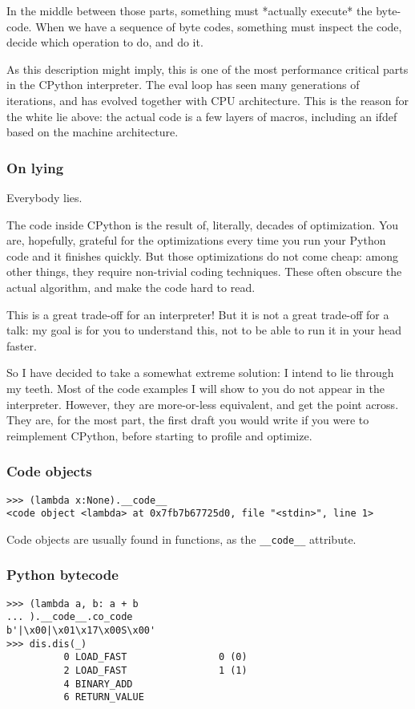 In the middle between those parts,
something must
*actually execute*
the byte-code.
When we have a sequence of byte codes,
something must inspect the code,
decide which operation to do,
and do it.

As this description might imply,
this is one of the most performance critical parts
in the CPython interpreter.
The eval loop has seen many generations of iterations,
and has evolved together with CPU architecture.
This is the reason for the white lie above:
the actual code is a few layers of macros,
including an ifdef based on the machine architecture.

\begin{frame}[fragile]
\frametitle{On lying}

Everybody lies.
\end{frame}

The code inside CPython is the result of,
literally,
decades of optimization.
You are,
hopefully,
grateful for the optimizations every time you run your Python code
and it finishes quickly.
But those optimizations do not come cheap:
among other things,
they require non-trivial coding techniques.
These often obscure the actual algorithm,
and make the code hard to read.

This is a great trade-off for an interpreter!
But it is not a great trade-off for a talk:
my goal is for you to understand this,
not to be able to run it in your head faster.

So I have decided to take a somewhat extreme solution:
I intend to lie through my teeth.
Most of the code examples I will show to you do not
appear in the interpreter.
However,
they are more-or-less equivalent,
and get the point across.
They are,
for the most part,
the first draft you would write if you were to reimplement CPython,
before starting to profile and optimize.


\begin{frame}[fragile]
\frametitle{Code objects}

\begin{lstlisting}
>>> (lambda x:None).__code__
<code object <lambda> at 0x7fb7b67725d0, file "<stdin>", line 1>
\end{lstlisting}

\end{frame}

Code objects are usually found in functions,
as the \verb|__code__| attribute.

\begin{frame}[fragile]
\frametitle{Python bytecode}

\begin{lstlisting}
>>> (lambda a, b: a + b
... ).__code__.co_code
b'|\x00|\x01\x17\x00S\x00'
>>> dis.dis(_)
          0 LOAD_FAST                0 (0)
          2 LOAD_FAST                1 (1)
          4 BINARY_ADD
          6 RETURN_VALUE
\end{lstlisting}

\end{frame}

